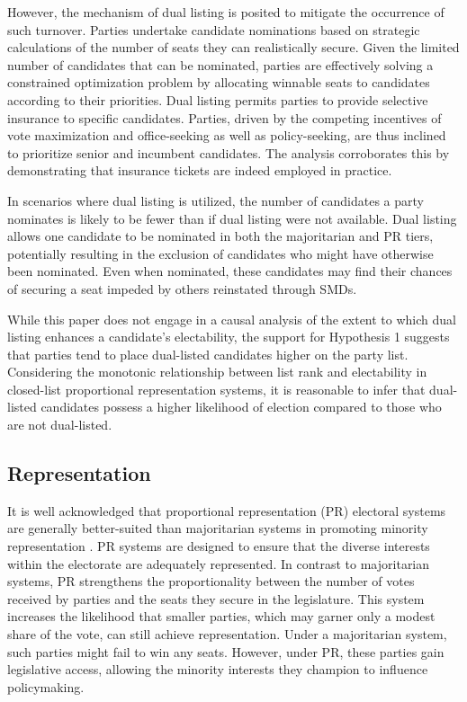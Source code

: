 \documentclass[a4paper, 11pt]{article}
\begin{document}
However, the mechanism of dual listing is posited to mitigate the occurrence of such turnover. Parties undertake candidate nominations based on strategic calculations of the number of seats they can realistically secure. Given the limited number of candidates that can be nominated, parties are effectively solving a constrained optimization problem by allocating winnable seats to candidates according to their priorities. Dual listing permits parties to provide selective insurance to specific candidates. Parties, driven by the competing incentives of vote maximization and office-seeking as well as policy-seeking, are thus inclined to prioritize senior and incumbent candidates. The analysis corroborates this by demonstrating that insurance tickets are indeed employed in practice. 

In scenarios where dual listing is utilized, the number of candidates a party nominates is likely to be fewer than if dual listing were not available. Dual listing allows one candidate to be nominated in both the majoritarian and PR tiers, potentially resulting in the exclusion of candidates who might have otherwise been nominated. Even when nominated, these candidates may find their chances of securing a seat impeded by others reinstated through SMDs.

While this paper does not engage in a causal analysis of the extent to which dual listing enhances a candidate's electability, the support for Hypothesis 1 suggests that parties tend to place dual-listed candidates higher on the party list. Considering the monotonic relationship between list rank and electability in closed-list proportional representation systems, it is reasonable to infer that dual-listed candidates possess a higher likelihood of election compared to those who are not dual-listed.\footnotemark{}


\subsection{Representation}

It is well acknowledged that proportional representation (PR) electoral systems are generally better-suited than majoritarian systems in promoting minority representation \citep{matland_contagion_1996, matland_womens_1998, meserve_gender_2020}. PR systems are designed to ensure that the diverse interests within the electorate are adequately represented. In contrast to majoritarian systems, PR strengthens the proportionality between the number of votes received by parties and the seats they secure in the legislature. This system increases the likelihood that smaller parties, which may garner only a modest share of the vote, can still achieve representation. Under a majoritarian system, such parties might fail to win any seats. However, under PR, these parties gain legislative access, allowing the minority interests they champion to influence policymaking. 
\end{document}
